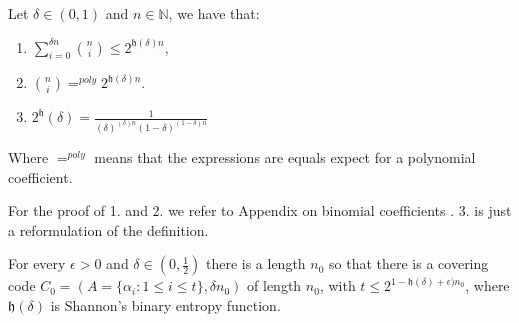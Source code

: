 \begin{proposition}\label{pro:shannon}
  Let $\delta \in (0,1)$ and $n\in \mathbb{N}$, we have that:
  \begin{enumerate}
\item $ \sum_{i=0}^{\delta n}  {n\choose i} \le 2^{\mathfrak{h}(\delta)n},$
\item $ {n\choose i} =^{poly} 2^{\mathfrak{h}(\delta)n}.$
\item $ 2^\mathfrak{h}(\delta) = \frac{1}{(\delta)^{(\delta) n}(1-\delta)^{(1-\delta) n}} $
  \end{enumerate}

  Where $=^{poly}$ means that the expressions are equals expect for a polynomial coefficient. 
\end{proposition}

For the proof of 1. and 2. we refer to Appendix on binomial coefficients \cite{schoning2013satisfiability}. 3. is just a reformulation of the definition. 

\begin{lemma}
  For every $\epsilon > 0$ and $\delta \in (0, \frac{1}{2})$ there is a length $n_0$ so that there is a covering code $C_0 = (A=\{\alpha_i : 1\le i\le t\}, \delta n_0)$ of length $n_0$, with $t\le 2^{1-\mathfrak{h}(\delta)+\epsilon)n_0}$, where $\mathfrak{h}(\delta)$ is Shannon's binary entropy function.
  
\end{lemma}

